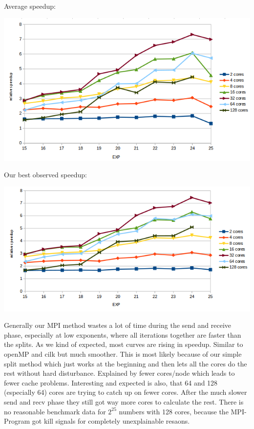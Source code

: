 Average speedup:
\begin{center}
\includegraphics[width=\textwidth]{MPI_med}
\end{center}
Our best observed speedup:
\begin{center}
\includegraphics[width=\textwidth]{MPI_best}
\end{center}

Generally our MPI method wastes a lot of time during the send and receive phase, especially at low exponents, where all iterations together are faster than the splits. As we kind of expected, most curves are rising in speedup. Similar to openMP and cilk but much smoother. This is most likely because of our simple split method which just works at the beginning and then lets all the cores do the rest without hard disturbance. Explained by fewer cores/node which leads to fewer cache problems. \newline
Interesting and expected is also, that 64 and 128 (especially 64) cores are trying to catch up on fewer cores. After the much slower send and recv phase they still got way more cores to calculate the rest. There is no reasonable benchmark data for \(2^{25}\) numbers with 128 cores, because the MPI-Program got kill signals for completely unexplainable resaons. \newline



